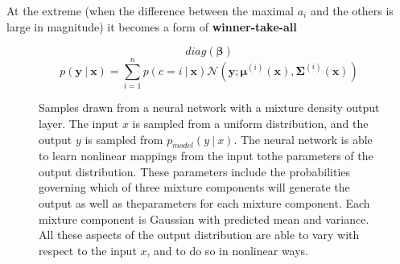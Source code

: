   At the extreme (when the difference between the maximal $a_i$ and the others is large in magnitude) it becomes a form of \textbf{winner-take-all}
  

  \begin{equation} \tag{6.34}
    \label{eq_6_34}
    diag(\bm{\beta})
  \end{equation}
  \begin{equation} \tag{6.35}
    \label{eq_6_35}
    p( \bm{y}\ |\ \bm{x} ) =
      \sum ^ n _ {i=1} p( c=i\ |\ \bm{x} )
      \mathcal{N}( \bm{y}; \bm{\mu} ^ {(i)} (\bm{x}), \bm{\Sigma} ^ {(i)} (\bm{x}) )
  \end{equation}

  \setcounter{figure}{3}
  \begin{figure}[ht]
    \begin{center}
      \caption{Samples drawn from a neural network with a mixture density output layer.
	The input $x$ is sampled from a uniform distribution,
	and the output $y$ is sampled from $p _ {model} (y\ |\ x)$.
	The neural network is able to learn nonlinear mappings from the input tothe parameters of the output distribution.
        These parameters include the probabilities governing which of three mixture components will generate the output as well as theparameters for each mixture component.
        Each mixture component is Gaussian with predicted mean and variance.
        All these aspects of the output distribution are able to vary with respect to the input $x$,
        and to do so in nonlinear ways.}\label{fig:NN_mixture_density_output_layer}
    \end{center}
  \end{figure}
